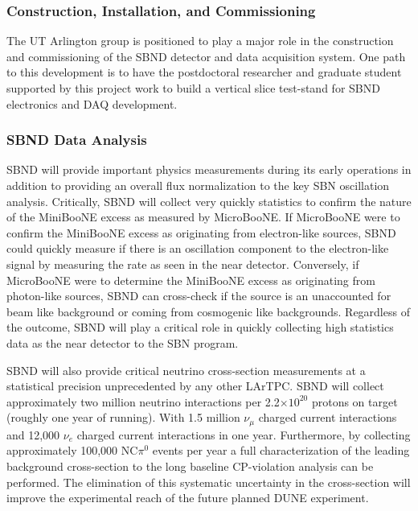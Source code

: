 \subsubsection{Construction, Installation, and Commissioning}\label{sec:SBNDBulid}
The UT Arlington group is positioned to play a major role in the construction and commissioning of the SBND detector and  data acquisition system.  One path to this development is to have the postdoctoral researcher and graduate student supported by this project work to build a vertical slice test-stand for SBND electronics and DAQ development.  





\subsubsection{SBND Data Analysis}\label{sec:SBNDBulid}
SBND will provide important physics measurements during its early operations in addition to providing an overall flux normalization to the key SBN oscillation analysis. Critically, SBND will collect very quickly statistics to confirm the nature of the MiniBooNE excess as measured by MicroBooNE. If MicroBooNE were to confirm the MiniBooNE excess as originating from electron-like sources, SBND could quickly measure if there is an oscillation component to the electron-like signal by measuring the rate as seen in the near detector. Conversely, if MicroBooNE were to determine the MiniBooNE excess as originating from photon-like sources, SBND can cross-check if the source is an unaccounted for beam like background or coming from cosmogenic like backgrounds. Regardless of the outcome, SBND will play a critical role in quickly collecting high statistics data as the near detector to the SBN program.

SBND will also provide critical neutrino cross-section measurements at a statistical precision unprecedented by any other LArTPC. SBND will collect approximately two million neutrino interactions per 2.2$\times 10^{20}$ protons  on target (roughly one year of running). With 1.5 million $\nu_{\mu}$ charged current interactions and 12,000 $\nu_{e}$ charged current interactions in one year. Furthermore, by collecting approximately 100,000 NC$\pi^{0}$ events per year a full characterization of the leading background cross-section to the long baseline CP-violation analysis can be performed. The elimination of this systematic uncertainty in the cross-section will improve the experimental reach of the future planned DUNE experiment.

